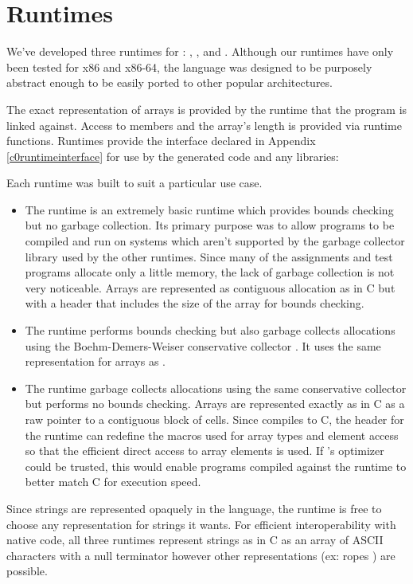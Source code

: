 \section{Runtimes}

We've developed three runtimes for \langname{}: ,
, and . Although our runtimes have only been
tested for x86 and x86-64, the language was designed to be purposely abstract
enough to be easily ported to other popular architectures.

The exact representation of arrays is provided by the runtime that the program
is linked against. Access to members and the array's length is provided via
runtime functions. Runtimes provide the interface declared in Appendix
\ref{c0runtimeinterface} for use by the generated code and any libraries:

Each runtime was built to suit a particular use case.

\begin{itemize}
\item
The  runtime is an extremely basic runtime which provides bounds
checking but no garbage collection. Its primary purpose was to allow
\langname{} programs to be compiled and run on systems which aren't supported by
the garbage collector library used by the other runtimes. Since many of the
assignments and test programs allocate only a little memory, the lack of garbage
collection is not very noticeable. Arrays are represented as contiguous
allocation as in C but with a header that includes the size of the array for
bounds checking.

\item
The  runtime performs bounds checking but also garbage collects
allocations using the Boehm-Demers-Weiser conservative collector \cite{BoehmGC}.
It uses the same representation for arrays as .

\item
The  runtime garbage collects allocations using the same
conservative collector but performs no bounds checking. Arrays are represented
exactly as in C as a raw pointer to a contiguous block of cells. Since
 compiles to C, the header for the runtime can redefine the
macros used for array types and element access so that the efficient direct
access to array elements is used. If 's optimizer could be
trusted, this would enable \langname{} programs compiled against the
 runtime to better match C for execution speed.

\end{itemize}

Since strings are represented opaquely in the language, the runtime is free to
choose any representation for strings it wants. For efficient interoperability
with native code, all three runtimes represent strings as in C as an array of
ASCII characters with a null terminator however other representations (ex: ropes
\cite{Boehm95ropes}) are possible.
